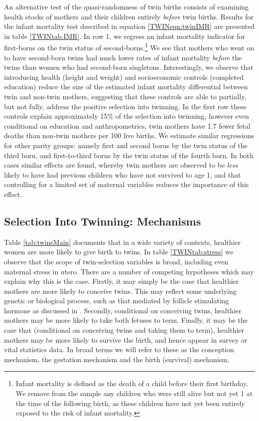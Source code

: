 \documentclass[subeqn]{article}
\begin{document}
\begin{spacing}{1.4}
An alternative test of the quasi-randomness of twin births consists of examining
health stocks of mothers and their children entirely \emph{before} twin births.
Results for the infant mortality test described in equation \ref{TWINeqn:twinIMR}
are presented in table \ref{TWINtab:IMR}. In row 1, we regress an infant mortality
indicator for first-borns on the twin status of second-borns.\footnote{Infant
  mortality is defined as the death of a child before their first birthday. We
  remove from the sample any children who were still alive but not yet 1 at the
  time of the following birth, as these children have not yet been entirely
  exposed to the risk of infant mortality.}  We see that mothers who went on to
have second-born twins had much lower rates of infant mortality \emph{before} the
twins than women who had second-born singletons.  Interestingly, we observe that
introducing health (height and weight) and socioeconomic controls (completed
education) reduce the size of the estimated infant mortality differential between
twin and non-twin mothers, suggesting that these controls are able to partially,
but not fully, address the positive selection into twinning.  In the first row
these controls explain approximately 15\% of the selection into twinning, however
even conditional on education and anthropometrics, twin mothers have 1.7 fewer fetal
deaths than non-twin mothers per 100 live births.  We estimate similar regressions
for other parity groups: namely first and second borns by the twin status of the
third born, and first-to-third borns by the twin status of the fourth born.  In
both cases similar effects are found, whereby twin mothers are observed to be
\emph{less} likely to have had previous children who have not survived to age 1,
and that controlling for a limited set of maternal variables reduces the importance
of this effect.



\subsection{Selection Into Twinning: Mechanisms}   \label{TWINsscn:selection}
Table \ref{tab:twinsMain} documents that in a wide variety of contexts,
healthier women are more likely to give birth to twins.  In table
\ref{TWINtab:stress} we observe that the scope of twin-selection variables is
broad, including even maternal stress in utero.  There are a number of competing
hypotheses which may explain why this is the case.  Firstly, it may simply be
the case that healthier mothers are more likely to conceive twins.  This may
reflect some underlying genetic or biological process, 
such as that mediated by follicle stimulating hormone as discussed in 
\citet{Hall2003}.  Secondly, conditional on conceiving twins, healthier mothers 
may be more likely to take both fetuses to term.  Finally, it may be the case 
that (conditional on conceiving twins and taking them to term), healthier mothers 
may be more likely to survive the birth, and hence appear in survey or vital 
statistics data.  In broad terms we will refer to these as the conception 
mechanism, the gestation mechanism and the birth (survival) mechanism.


\end{spacing}
\end{document}

